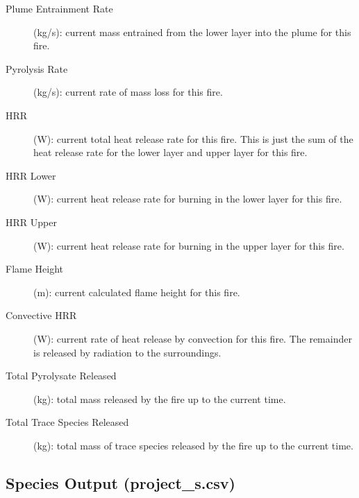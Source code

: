 \begin{description}
\item[Plume Entrainment Rate] (kg/s): current mass entrained from the lower layer into the plume for this fire.
\item[Pyrolysis Rate] (kg/s): current rate of mass loss for this fire.
\item[HRR] (W): current total heat release rate for this fire. This is just the sum of the heat release rate for the lower layer and upper layer for this fire.
\item[HRR Lower] (W): current heat release rate for burning in the lower layer for this fire.
\item[HRR Upper] (W):  current heat release rate for burning in the upper layer for this fire.
\item[Flame Height] (m): current calculated flame height for this fire.
\item[Convective HRR] (W): current rate of heat release by convection for this fire.  The remainder is released by radiation to the surroundings.
\item[Total Pyrolysate Released] (kg): total mass released by the fire up to the current time.
\item[Total Trace Species Released] (kg): total mass of trace species released by the fire up to the current time.
\end{description}

\subsection{Species Output (project\_s.csv)}

